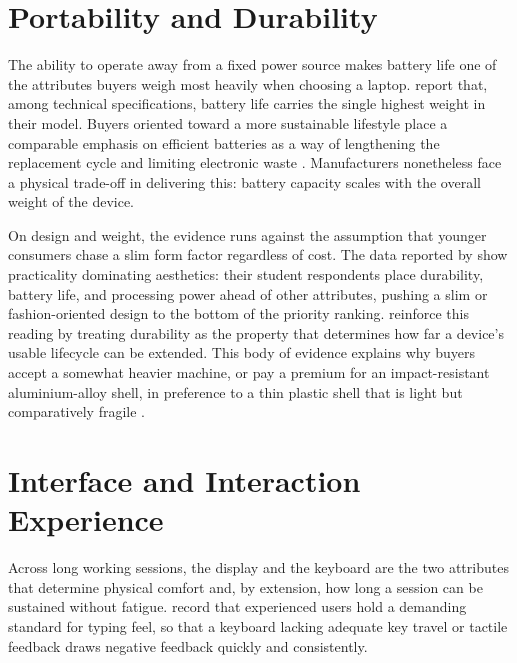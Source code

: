 \section{Portability and Durability}\label{app:theory-portability}

The ability to operate away from a fixed power source makes battery life one of the
attributes buyers weigh most heavily when choosing a laptop.
\textcite{weng_siew_lam_evaluation_2023} report that, among technical specifications,
battery life carries the single highest weight in their model. Buyers oriented toward a
more sustainable lifestyle place a comparable emphasis on efficient batteries as a way of
lengthening the replacement cycle and limiting electronic waste
\parencite{liao_determinants_2022}. Manufacturers nonetheless face a physical trade-off in
delivering this: battery capacity scales with the overall weight of the device.

On design and weight, the evidence runs against the assumption that younger consumers chase
a slim form factor regardless of cost. The data reported by
\textcite{weng_siew_lam_evaluation_2023} show practicality dominating aesthetics: their
student respondents place durability, battery life, and processing power ahead of other
attributes, pushing a slim or fashion-oriented design to the bottom of the priority
ranking. \textcite{zakeri_decision_2023} reinforce this reading by treating durability as
the property that determines how far a device's usable lifecycle can be extended. This
body of evidence explains why buyers accept a somewhat heavier machine, or pay a premium
for an impact-resistant aluminium-alloy shell, in preference to a thin plastic shell that is
light but comparatively fragile \parencite{liao_determinants_2022}.

\section{Interface and Interaction Experience}\label{app:theory-interface}

Across long working sessions, the display and the keyboard are the two attributes that
determine physical comfort and, by extension, how long a session can be sustained without
fatigue. \textcite{maghsoudi_hybrid_2026} record that experienced users hold a demanding
standard for typing feel, so that a keyboard lacking adequate key travel or tactile
feedback draws negative feedback quickly and consistently.

